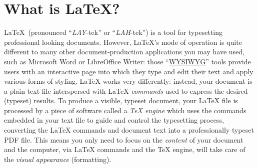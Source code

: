 \section{What is \LaTeX?}

\LaTeX\ (pronounced “\emph{LAY}-tek” or “\emph{LAH}-tek”) is a tool for typesetting professional looking documents. However, LaTeX’s mode of operation is quite different to many other document-production applications you may have used, such as Microsoft Word or LibreOffice Writer: those “\href{https://en.wikipedia.org/wiki/WYSIWYG}{WYSIWYG}” tools provide users with an interactive page into which they type and edit their text and apply various forms of styling. LaTeX works very differently: instead, your document is a plain text file interspersed with LaTeX \emph{commands} used to express the desired (typeset) results. To produce a visible, typeset document, your LaTeX file is processed by a piece of software called a \emph{TeX engine} which uses the commands embedded in your text file to guide and control the typesetting process, converting the LaTeX commands and document text into a professionally typeset PDF file. This means you only need to focus on the \emph{content} of your document and the computer, via LaTeX commands and the TeX engine, will take care of the \emph{visual appearance} (formatting).